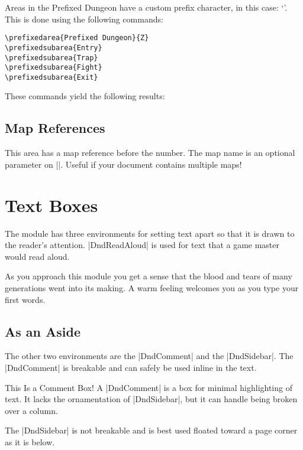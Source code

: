 \documentclass[letterpaper,twocolumn,openany,nodeprecatedcode]{dndbook}
\begin{document}
Areas in the Prefixed Dungeon have a custom prefix character,
in this case: `\prefixedareaprefix'.
This is done using the following commands:

\begin{verbatim}
\prefixedarea{Prefixed Dungeon}{Z}
\prefixedsubarea{Entry}
\prefixedsubarea{Trap}
\prefixedsubarea{Fight}
\prefixedsubarea{Exit}
\end{verbatim}

These commands yield the following results:

\section{Map References}

This area has a map reference before the number. The map name is an optional parameter on |\DndArea|. Useful if your document contains multiple maps!

\chapter{Text Boxes}

The module has three environments for setting text apart so that it is drawn to the reader's attention. |DndReadAloud| is used for text that a game master would read aloud.

\begin{DndReadAloud}
  As you approach this module you get a sense that the blood and tears of many generations went into its making. A warm feeling welcomes you as you type your first words.
\end{DndReadAloud}

\section{As an Aside}
The other two environments are the |DndComment| and the |DndSidebar|. The |DndComment| is breakable and can safely be used inline in the text.

\begin{DndComment}{This Is a Comment Box!}
  A |DndComment| is a box for minimal highlighting of text. It lacks the ornamentation of |DndSidebar|, but it can handle being broken over a column.
\end{DndComment}

The |DndSidebar| is not breakable and is best used floated toward a page corner as it is below.
\end{document}
